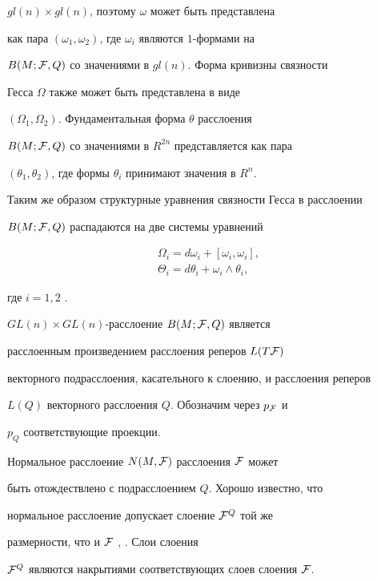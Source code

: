 $gl(n)\times gl(n)$, поэтому $\omega$ может быть представлена


как пара $(\omega_1, \omega_2)$, где $\omega_i$ являются $1$-формами на


$B(M; {\cal F}, Q)$ со значениями в $gl(n)$. Форма кривизны связности


Гесса $\Omega$ также может быть представлена в виде


$(\Omega_1, \Omega_2)$. Фундаментальная форма $\theta$ расслоения


$B(M; {\cal F}, Q)$ со значениями в $R^{2n}$ представляется как пара


$(\theta_1, \theta_2)$, где формы $\theta_i$ принимают значения в $R^n$.


Таким же образом структурные уравнения связности Гесса в расслоении


$B(M; {\cal F}, Q)$ распадаются на две системы уравнений


\begin{gather*}


\Omega_i = d{\omega}_i + [\omega_i, \omega_i],\\


\Theta_i = d\theta_i + \omega_i\wedge\theta_i,


\end{gather*}


где $i = 1, 2$ \cite{WO0}.





$GL(n)\times GL(n)$-расслоение $B(M; {\cal F}, Q)$ является


расслоенным произведением расслоения реперов $L(T{\cal F})$


векторного подрасслоения, касательного к слоению, и расслоения реперов


$L(Q)$ векторного расслоения $Q$. Обозначим через ${p}_{\cal F}$ и


${p}_Q$ соответствующие проекции.





Нормальное расслоение $N(M, {\cal F})$ расслоения $\cal F$ может


быть отождествлено с подрасслоением $Q$. Хорошо известно, что


нормальное расслоение допускает слоение ${\cal F}^Q$ той же


размерности, что и $\cal F$ \cite{WO2}, \cite{WO3}. Слои слоения


${\cal F}^Q$ являются накрытиями соответствующих слоев слоения $\cal F$.


